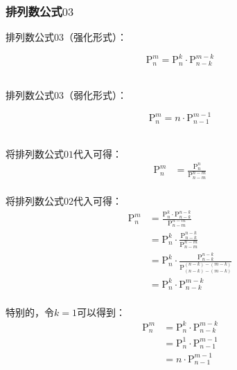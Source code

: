 \documentclass[UTF8]{ctexart}
\begin{document}
\subsubsection{排列数公式$03$}
    排列数公式$03$（强化形式）：
    \begin{large}
        \begin{equation*}
            \mathrm{P}_n^m=\mathrm{P}_n^k\cdot\mathrm{P}_{n-k}^{m-k}
        \end{equation*}
    \end{large}\\
    排列数公式$03$（弱化形式）：
    \begin{large}
        \begin{equation*}
            \mathrm{P}_n^m=n\cdot\mathrm{P}_{n-1}^{m-1}
        \end{equation*}
    \end{large}\\
    将排列数公式$01$代入可得：
    \setcounter{equation}{0}
    \begin{align}
        \mathrm{P}_n^m&=\frac{\mathrm{P}_n^n}{\mathrm{P}_{n-m}^{n-m}}
    \end{align}\\
    将排列数公式$02$代入可得：
    \begin{align}
        \mathrm{P}_n^m
        &=\frac{\mathrm{P}_n^k\cdot\mathrm{P}_{n-k}^{n-k}}{\mathrm{P}_{n-m}^{n-m}}\\[3mm]
        &=\mathrm{P}_n^k\cdot\frac{\mathrm{P}_{n-k}^{n-k}}{\mathrm{P}_{n-m}^{n-m}}\\[3mm]
        &=\mathrm{P}_n^k\cdot\frac{\mathrm{P}_{n-k}^{n-k}}{\mathrm{P}_{(n-k)-(m-k)}^{(n-k)-(m-k)}}\\[3mm]
        &=\mathrm{P}_n^k\cdot\mathrm{P}_{n-k}^{m-k}
    \end{align}\\
    特别的，令$k=1$可以得到：
    \begin{align}
        \mathrm{P}_n^m
        &=\mathrm{P}_n^k\cdot\mathrm{P}_{n-k}^{m-k}\\[3mm]
        &=\mathrm{P}_n^1\cdot\mathrm{P}_{n-1}^{m-1}\\[3mm]
        &=n\cdot\mathrm{P}_{n-1}^{m-1}
    \end{align}

\newpage
\end{document}
